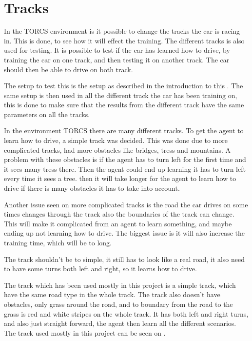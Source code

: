 \section{Tracks}\label{Tracks}
In the TORCS environment is it possible to change the tracks the car is racing in. This is done, to see how it will effect the training. The different tracks is also used for testing. It is possible to test if the car has learned how to drive, by training the car on one track, and then testing it on another track. The car should then be able to drive on both track.  

The setup to test this is the setup as described in the introduction to this . The same setup is then used in all the different track the car has been training on, this is done to make sure that the results from the different track have the same parameters on all the tracks. 

In the environment TORCS there are many different tracks. To get the agent to learn how to drive, a simple track was decided. This was done due to more complicated tracks, had more obstacles like bridges, tress and mountains. A problem with these obstacles is if the agent has to turn left for the first time and it sees many tress there. Then the agent could end up learning it has to turn left every time it sees a tree. then it will take longer for the agent to learn how to drive if there is many obstacles it has to take into account. 

Another issue seen on more complicated tracks is the road the car drives on some times changes through the track also the boundaries of the track can change. This will make it complicated from an agent to learn something, and maybe ending up not learning how to drive. The biggest issue is it will also increase the training time, which will be to long. 

The track shouldn't be to simple, it still has to look like a real road, it also need to have some turns both left and right, so it learns how to drive. 

The track which has been used mostly in this project is a simple track, which have the same road type in the whole track. The track also doesn't have obstacles, only grass around the road, and to boundary from the road to the grass is red and white stripes on the whole track. It has both left and right turns, and also just straight forward, the agent then learn all the different scenarios. The track used mostly in this project can be seen on .

